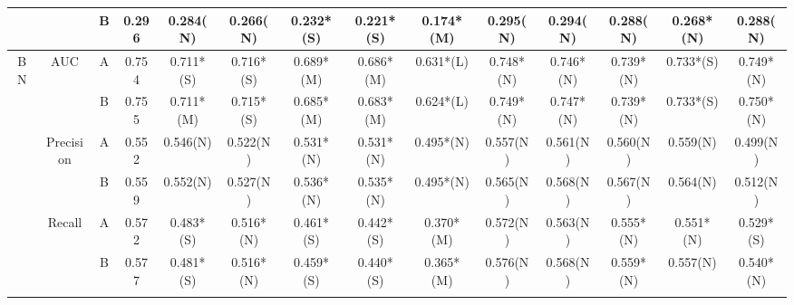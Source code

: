 \begin{table*}
{\begin{tabular}{|c|c|c|c|c|c|c|c|c|c|c|c|c|c|}
                      &                            & B                                                                             & 0.296         & 0.284(N)             & 0.266(N)         & 0.232*(S)       & 0.221*(S)       & 0.174*(M)         & 0.295(N)        & 0.294(N)       & 0.288(N)       & 0.268*(N)        & 0.288(N)      \\ \hline
\multirow{10}{*}{BN}  & \multirow{2}{*}{AUC}       & A                                                                             & 0.754         & 0.711*(S)            & 0.716*(S)        & 0.689*(M)       & 0.686*(M)       & 0.631*(L)         & 0.748*(N)       & 0.746*(N)      & 0.739*(N)      & 0.733*(S)        & 0.749*(N)     \\ \cline{3-14} 
                      &                            & B                                                                             & 0.755         & 0.711*(M)            & 0.715*(S)        & 0.685*(M)       & 0.683*(M)       & 0.624*(L)         & 0.749*(N)       & 0.747*(N)      & 0.739*(N)      & 0.733*(S)        & 0.750*(N)      \\ \cline{2-14} 
                      & \multirow{2}{*}{Precision} & A                                                                             & 0.552         & 0.546(N)             & 0.522(N)         & 0.531*(N)       & 0.531*(N)       & 0.495*(N)         & 0.557(N)        & 0.561(N)       & 0.560(N)        & 0.559(N)         & 0.499(N)      \\ \cline{3-14} 
                      &                            & B                                                                             & 0.559         & 0.552(N)             & 0.527(N)         & 0.536*(N)       & 0.535*(N)       & 0.495*(N)         & 0.565(N)        & 0.568(N)       & 0.567(N)       & 0.564(N)         & 0.512(N)      \\ \cline{2-14} 
                      & \multirow{2}{*}{Recall}    & A                                                                             & 0.572         & 0.483*(S)            & 0.516*(N)        & 0.461*(S)       & 0.442*(S)       & 0.370*(M)          & 0.572(N)        & 0.563(N)       & 0.555*(N)      & 0.551*(N)        & 0.529*(S)     \\ \cline{3-14} 
                      &                            & B                                                                             & 0.577         & 0.481*(S)            & 0.516*(N)        & 0.459*(S)       & 0.440*(S)        & 0.365*(M)         & 0.576(N)        & 0.568(N)       & 0.559*(N)      & 0.557(N)         & 0.540*(N)      \\ \cline{2-14} 

\end{tabular}}
\end{table*}
